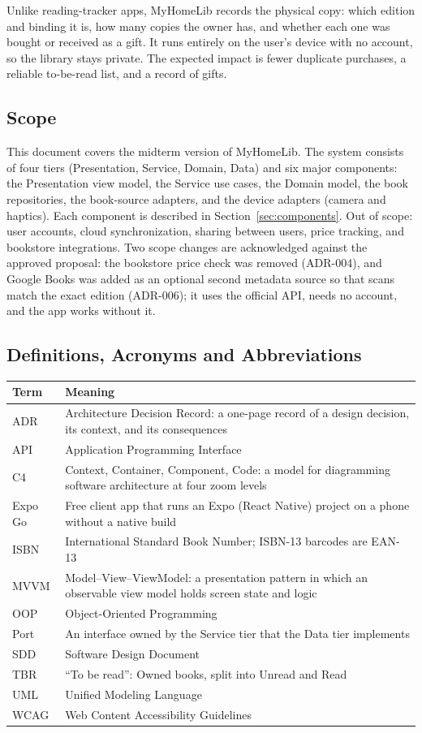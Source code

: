 \documentclass[12pt]{article}
\begin{document}
Unlike reading-tracker apps, MyHomeLib records the physical copy: which edition and binding it is, how many copies the owner has, and whether each one was bought or received as a gift. It runs entirely on the user's device with no account, so the library stays private. The expected impact is fewer duplicate purchases, a reliable to-be-read list, and a record of gifts.

\subsection{Scope}

This document covers the midterm version of MyHomeLib. The system consists of four tiers (Presentation, Service, Domain, Data) and six major components: the Presentation view model, the Service use cases, the Domain model, the book repositories, the book-source adapters, and the device adapters (camera and haptics). Each component is described in Section~\ref{sec:components}. Out of scope: user accounts, cloud synchronization, sharing between users, price tracking, and bookstore integrations. Two scope changes are acknowledged against the approved proposal: the bookstore price check was removed (ADR-004), and Google Books was added as an optional second metadata source so that scans match the exact edition (ADR-006); it uses the official API, needs no account, and the app works without it.

\subsection{Definitions, Acronyms and Abbreviations}

\begin{tabular}{|p{3cm}|p{11cm}|}
\hline
\textbf{Term} & \textbf{Meaning} \\
\hline
ADR & Architecture Decision Record: a one-page record of a design decision, its context, and its consequences \\
API & Application Programming Interface \\
C4 & Context, Container, Component, Code: a model for diagramming software architecture at four zoom levels \\
Expo Go & Free client app that runs an Expo (React Native) project on a phone without a native build \\
ISBN & International Standard Book Number; ISBN-13 barcodes are EAN-13 \\
MVVM & Model--View--ViewModel: a presentation pattern in which an observable view model holds screen state and logic \\
OOP & Object-Oriented Programming \\
Port & An interface owned by the Service tier that the Data tier implements \\
SDD & Software Design Document \\
TBR & ``To be read'': Owned books, split into Unread and Read \\
UML & Unified Modeling Language \\
WCAG & Web Content Accessibility Guidelines \\
\hline
\end{tabular}
\end{document}
